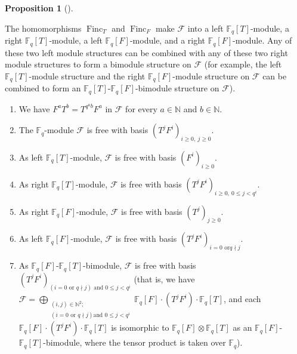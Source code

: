 \documentclass[numbers=enddot,12pt,final,onecolumn,notitlepage]{scrartcl}%
\theoremstyle{definition}
\newtheorem{prop}[theo]{Proposition}
\newenvironment{proposition}[1][]
{\begin{prop}[#1]\begin{leftbar}}
{\end{leftbar}\end{prop}}
\begin{document}
\begin{proposition}
\label{prop.F.bases}The homomorphisms $\operatorname*{Finc}\nolimits_{T}$ and
$\operatorname*{Finc}\nolimits_{F}$ make $\mathcal{F}$ into a left
$\mathbb{F}_{q}\left[  T\right]  $-module, a right $\mathbb{F}_{q}\left[
T\right]  $-module, a left $\mathbb{F}_{q}\left[  F\right]  $-module, and a
right $\mathbb{F}_{q}\left[  F\right]  $-module. Any of these two left module
structures can be combined with any of these two right module structures to
form a bimodule structure on $\mathcal{F}$ (for example, the left
$\mathbb{F}_{q}\left[  T\right]  $-module structure and the right
$\mathbb{F}_{q}\left[  F\right]  $-module structure on $\mathcal{F}$ can be
combined to form an $\mathbb{F}_{q}\left[  T\right]  $-$\mathbb{F}_{q}\left[
F\right]  $-bimodule structure on $\mathcal{F}$).

\begin{enumerate}
\item[\textbf{(a)}] We have $F^{a}T^{b}=T^{q^{a}b}F^{a}$ in $\mathcal{F}$ for
every $a\in\mathbb{N}$ and $b\in\mathbb{N}$.

\item[\textbf{(b)}] The $\mathbb{F}_{q}$-module $\mathcal{F}$ is free with
basis $\left(  T^{j}F^{i}\right)  _{i\geq0,\ j\geq0}$.

\item[\textbf{(c)}] As left $\mathbb{F}_{q}\left[  T\right]  $-module,
$\mathcal{F}$ is free with basis $\left(  F^{i}\right)  _{i\geq0}$.

\item[\textbf{(d)}] As right $\mathbb{F}_{q}\left[  T\right]  $-module,
$\mathcal{F}$ is free with basis $\left(  T^{j}F^{i}\right)  _{i\geq0,\ 0\leq
j<q^{i}}$.

\item[\textbf{(e)}] As right $\mathbb{F}_{q}\left[  F\right]  $-module,
$\mathcal{F}$ is free with basis $\left(  T^{j}\right)  _{j\geq0}$.

\item[\textbf{(f)}] As left $\mathbb{F}_{q}\left[  F\right]  $-module,
$\mathcal{F}$ is free with basis $\left(  T^{j}F^{i}\right)  _{i=0\text{ or
}q\nmid j}$.

\item[\textbf{(g)}] As $\mathbb{F}_{q}\left[  F\right]  $-$\mathbb{F}%
_{q}\left[  T\right]  $-bimodule, $\mathcal{F}$ is free with basis $\left(
T^{j}F^{i}\right)  _{\left(  i=0\text{ or }q\nmid j\right)  \text{ and }0\leq
j<q^{i}}$ (that is, we have $\mathcal{F}=\bigoplus\limits_{\substack{\left(
i,j\right)  \in\mathbb{N}^{2};\\\left(  i=0\text{ or }q\nmid j\right)  \text{
and }0\leq j<q^{i}}}\mathbb{F}_{q}\left[  F\right]  \cdot\left(  T^{j}%
F^{i}\right)  \cdot\mathbb{F}_{q}\left[  T\right]  $, and each $\mathbb{F}%
_{q}\left[  F\right]  \cdot\left(  T^{j}F^{i}\right)  \cdot\mathbb{F}%
_{q}\left[  T\right]  $ is isomorphic to $\mathbb{F}_{q}\left[  F\right]
\otimes\mathbb{F}_{q}\left[  T\right]  $ as an $\mathbb{F}_{q}\left[
F\right]  $-$\mathbb{F}_{q}\left[  T\right]  $-bimodule, where the tensor
product is taken over $\mathbb{F}_{q}$).
\end{enumerate}
\end{proposition}
\end{document}
